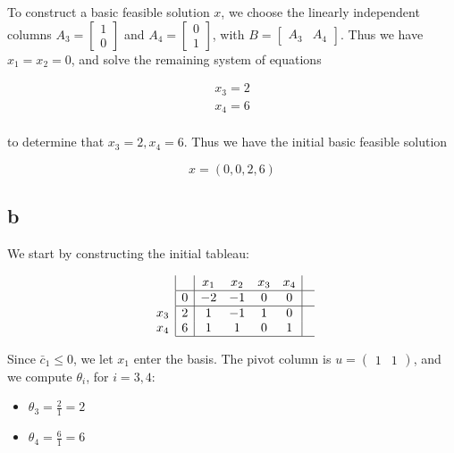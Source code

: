 \documentclass[11pt,a4paper]{article}
\begin{document}
To construct a basic feasible solution $x$, we choose the linearly independent columns $A_3=\begin{bmatrix}1\\0\end{bmatrix}$ and $A_4=\begin{bmatrix}0\\1\end{bmatrix}$, with $B=\begin{bmatrix}A_3 & A_4\end{bmatrix}$. Thus we have $x_1=x_2=0$, and solve the remaining system of equations

$$
\begin{array}{c}
x_3=2\\
x_4=6\\
\end{array}
$$

to determine that $x_3=2, x_4=6$. Thus we have the initial basic feasible solution

$$
x=(0,0,2,6)
$$

\subsection{b}

We start by constructing the initial tableau:

$$
\begin{array}{c}
\\
 \\
x_3 \\
x_4 \\ 
\end{array}
\begin{array}{|c|cccc|c}
    & x_1 & x_2 & x_3 & x_4 &  \\ \hline
  0 & -2 & -1 & 0 & 0 & \\ \hline
  2 & 1 & -1 & 1 & 0 & \\
  6 & 1 & 1 & 0 & 1 & \\\hline
\end{array}
$$

Since $\bar{c}_1\leq 0$, we let $x_1$ enter the basis. The pivot column is $u=\begin{pmatrix}1 & 1\end{pmatrix}$, and we compute $\theta_i$, for $i=3,4$:

\begin{itemize}
\item $\theta_3=\frac{2}{1}=2$
\item $\theta_4=\frac{6}{1}=6$
\end{itemize}
\end{document}
